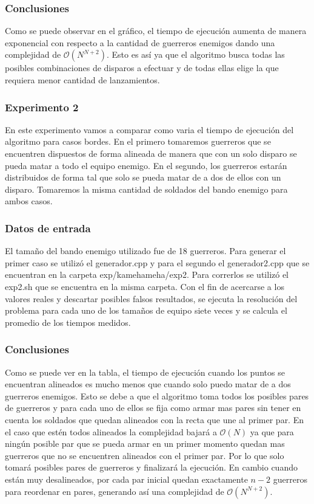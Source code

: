 		\subsubsection*{Conclusiones}\;

			Como se puede observar en el gráfico, el tiempo de ejecución aumenta de manera exponencial con respecto a la cantidad de guerreros enemigos dando una complejidad de $\mathcal{O}(N^{N+2})$. Esto es así ya que el algoritmo busca todas las posibles combinaciones de disparos a efectuar y de todas ellas elige la que requiera menor cantidad de lanzamientos. \;

		\;
		\;
		
    	\subsubsection*{Experimento 2}\;
    		En este experimento vamos a comparar como varia el tiempo de ejecución del algoritmo para casos bordes. En el primero tomaremos guerreros que se encuentren dispuestos de forma alineada de manera que con un solo disparo se pueda matar a todo el equipo enemigo. En el segundo, los guerreros estarán distribuidos de forma tal que solo se pueda matar de a dos de ellos con un disparo. Tomaremos la misma cantidad de soldados del bando enemigo para ambos casos. \;

    	\subsubsection*{Datos de entrada}\;
    		El tamaño del bando enemigo utilizado fue de 18 guerreros.
			Para generar el primer caso se utilizó el generador.cpp y para el segundo el generador2.cpp que se encuentran en la carpeta exp/kamehameha/exp2. Para correrlos se utilizó el exp2.sh que se encuentra en la misma carpeta.\;
			Con el fin de acercarse a los valores reales y descartar posibles falsos resultados, se ejecuta la resolución del problema para cada uno de los tamaños de equipo siete veces y se calcula el promedio de los tiempos medidos.\;

		\subsubsection*{Conclusiones}\;
			Como se puede ver en la tabla, el tiempo de ejecución cuando los puntos se encuentran alineados es mucho menos que cuando solo puedo matar de a dos guerreros enemigos. Esto se debe a que el algoritmo toma todos los posibles pares de guerreros y para cada uno de ellos se fija como armar mas pares sin tener en cuenta los soldados que quedan alineados con la recta que une al primer par. En el caso que estén todos alineados la complejidad bajará a $\mathcal{O}(N)$ ya que para ningún posible par que se pueda armar en un primer momento quedan mas guerreros que no se encuentren alineados con el primer par. Por lo que solo tomará posibles pares de guerreros y finalizará la ejecución. En cambio cuando están muy desalineados, por cada par inicial quedan exactamente $n - 2$ guerreros para reordenar en pares, generando así una complejidad de $\mathcal{O}(N^{N+2})$.


